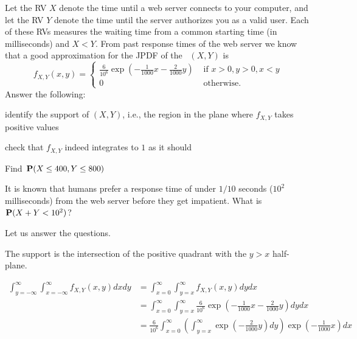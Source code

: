 \begin{example}\label{Eg:PlotPDF2ServerTimes}
Let the RV $X$ denote the time until a web server connects to your computer, and let the RV $Y$ denote the time until the server authorizes you as a valid user.  
Each of these RVs measures the waiting time from a common starting time (in milliseconds) and $X < Y$.  
From past response times of the web server we know that a good approximation for the JPDF of the \rv~$(X,Y)$ is
\[
f_{X,Y}(x,y) = 
\begin{cases}
\frac{6}{10^6} \exp \left( -\frac{1}{1000}x-\frac{2}{1000}y \right)
& \text{ if } x>0,y>0,x <y\\
0 & \text{ otherwise}.
\end{cases}
\]
Answer the following:
\be
\item identify the support of $(X,Y)$, i.e., the region in the plane where $f_{X,Y}$ takes positive values
\item check that $f_{X,Y}$ indeed integrates to $1$ as it should
\item Find $\mathbf{P}(X \leq 400, Y \leq 800)$
\item It is known that humans prefer a response time of under $1/10$ seconds ($10^2$ milliseconds) from the web server before they get impatient.  What is $\mathbf{P}(X+Y < 10^2)$? 
\ee
\begin{center}
\end{center}
Let us answer the questions.
\be
\item
The support is the intersection of the positive quadrant with the $y>x$ half-plane.
\item
{\scriptsize
\begin{align*}
\int_{y=-\infty}^{\infty}\int_{x=-\infty}^{\infty} f_{X,Y}(x,y) dx dy 
&= \int_{x=0}^{\infty}\int_{y=x}^{\infty} f_{X,Y}(x,y) dy dx\\
&= \int_{x=0}^{\infty}\int_{y=x}^{\infty} \frac{6}{10^6} \exp \left( -\frac{1}{1000}x-\frac{2}{1000}y \right) dy dx\\
&= \frac{6}{10^6} \int_{x=0}^{\infty} \left(\int_{y=x}^{\infty} \exp \left( -\frac{2}{1000}y \right) dy \right) \exp \left(-\frac{1}{1000}x\right) dx\\

\end{align*}}
\end{example}
